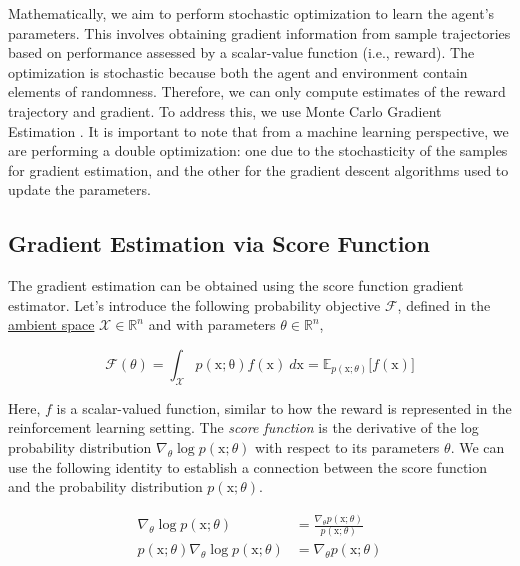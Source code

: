 \noindent Mathematically, we aim to perform stochastic optimization to learn the agent’s parameters. This involves obtaining gradient information from sample trajectories based on performance assessed by a scalar-value function (i.e., reward). The optimization is stochastic because both the agent and environment contain elements of randomness. Therefore, we can only compute estimates of the reward trajectory and gradient. To address this, we use Monte Carlo Gradient Estimation \citep{mohamed2020monte}. It is important to note that from a machine learning perspective, we are performing a double optimization: one due to the stochasticity of the samples for gradient estimation, and the other for the gradient descent algorithms used to update the parameters.

\subsection{Gradient Estimation via Score Function}

The gradient estimation can be obtained using the score function gradient estimator. Let's introduce the following probability objective $\mathcal{F}$, defined in the \href{https://en.wikipedia.org/wiki/Ambient_space_(mathematics)}{ambient space} $\mathcal{X}\in\mathbb{R}^n$ and with parameters $\theta\in\mathbb{R}^n$,

\begin{equation}\label{eqn:probability-objective}
\mathcal{F}(\theta) = \int_{\mathcal{X}} p(\mathrm{x; \theta})f(\mathrm{x})~d\mathrm{x} = \mathbb{E}_{p(\mathrm{x};\theta)}\big[f(\mathrm{x})\big]
\end{equation}

\noindent Here, $f$ is a scalar-valued function, similar to how the reward is represented in the reinforcement learning setting. The \textit{score function} is the derivative of the log probability distribution $\nabla_{\theta}\log p(\mathrm{x};\theta)$ with respect to its parameters $\theta$. We
can use the following identity to establish a connection between
the score function and the probability distribution $p(\mathrm{x};\theta)$.

\begin{equation}\label{eqn:log-derivative-trick-expression}
    \begin{split}
        \nabla_\theta\log p(\mathrm{x};\theta) &= \frac{\nabla_{\theta}p(\mathrm{x}; \theta)}{p(\mathrm{x};\theta)} \\
        p(\mathrm{x};\theta) \nabla_{\theta}\log p(\mathrm{x};\theta) &= \nabla_{\theta}p(\mathrm{x};\theta)
    \end{split}
\end{equation}

